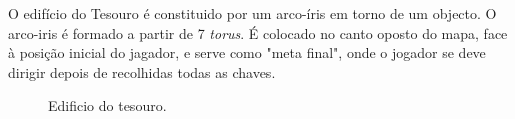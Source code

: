 	O edifício do Tesouro é constituido por um arco-íris em torno de um objecto. O arco-iris é formado a partir de 7 \textit{torus}. É colocado no canto oposto do mapa, face à posição inicial do jagador, e serve como "meta final", onde o jogador se deve dirigir depois de recolhidas todas as chaves.


\begin{figure}[here]
                 \caption{Edificio do tesouro.}
                 \label{fig:prototype}
\end{figure}

